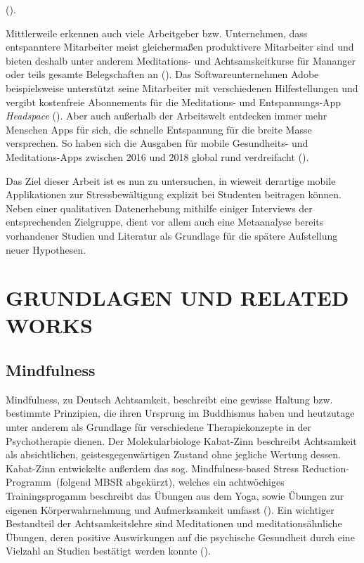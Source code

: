 \documentclass[10pt]{article}
\newcommand{\zit}[1]{(\cite{#1})}
\begin{document}
\zit{Stressbewältigung}.

Mittlerweile erkennen auch viele Arbeitgeber bzw. Unternehmen, dass entspanntere Mitarbeiter meist gleichermaßen produktivere Mitarbeiter sind und bieten deshalb unter anderem Meditations- und Achtsamskeitkurse für Mananger oder teils gesamte Belegschaften an \zit{Handelsblatt}. Das Softwareunternehmen Adobe beispielsweise unterstützt seine Mitarbeiter mit verschiedenen Hilfestellungen und vergibt kostenfreie Abonnements für die Meditations- und Entspannungs-App \textit{Headspace} \zit{Adobe}. 
Aber auch außerhalb der Arbeitswelt entdecken immer mehr Menschen Apps für sich, die schnelle Entspannung für die breite Masse versprechen. So haben sich die Ausgaben für mobile Gesundheits- und Meditations-Apps zwischen 2016 und 2018 global rund verdreifacht \zit{SteigendeNutzung}.

Das Ziel dieser Arbeit ist es nun zu untersuchen, in wieweit derartige mobile Applikationen zur Stressbewältigung explizit bei Studenten beitragen können.
Neben einer qualitativen Datenerhebung mithilfe einiger Interviews der entsprechenden Zielgruppe, dient vor allem auch eine Metaanalyse bereits vorhandener Studien und Literatur als Grundlage für die spätere Aufstellung neuer Hypothesen.
\bigbreak


\section{GRUNDLAGEN UND RELATED WORKS}

\subsection{Mindfulness}
Mindfulness, zu Deutsch Achtsamkeit, beschreibt eine gewisse Haltung bzw. bestimmte Prinzipien, die ihren Ursprung im Buddhismus haben und heutzutage unter anderem als Grundlage für verschiedene Therapiekonzepte in der Psychotherapie dienen. Der Molekularbiologe Kabat-Zinn beschreibt Achtsamkeit als absichtlichen, geistesgegenwärtigen Zustand ohne jegliche Wertung dessen. Kabat-Zinn entwickelte außerdem das sog. \grqq Mindfulness-based Stress Reduction-Programm\grqq\ (folgend MBSR abgekürzt), welches ein achtwöchiges Trainingsprogamm beschreibt das Übungen aus dem Yoga, sowie Übungen zur eigenen Körperwahrnehmung und Aufmerksamkeit umfasst \zit{AchtsamkeitBasics}. Ein wichtiger Bestandteil der Achtsamkeitslehre sind Meditationen und meditationsähnliche Übungen, deren positive Auswirkungen auf die psychische Gesundheit durch eine Vielzahl an Studien bestätigt werden konnte \zit{MindfulnessStudy2}.
\end{document}
